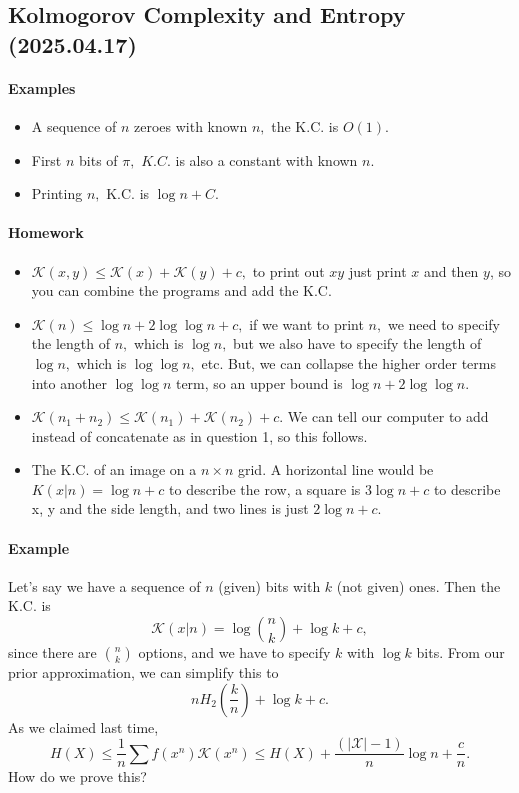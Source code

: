\documentclass[12pt]{article}
\theoremstyle{remark}
\begin{document}
\subsection{Kolmogorov Complexity and Entropy (2025.04.17)}
\paragraph{Examples}
\begin{itemize}
    \item A sequence of $n$ zeroes with known $n,$ the K.C. is $O(1).$
    \item First $n$ bits of $\pi,$ $K.C.$ is also a constant with known $n$.
    \item Printing $n,$ K.C. is $\log n +C.$
\end{itemize}

\paragraph{Homework}
\begin{itemize}
    \item $\mathcal{K}(x,y)\le \mathcal{K}(x)+\mathcal{K}(y)+c,$ to print out $xy$ just print $x$ and then $y$, so you can combine the programs and add the K.C.
    \item $\mathcal{K}(n)\le\log n+2\log\log n+c,$ if we want to print $n,$ we need to specify the length of $n,$ which is $\log n,$ but we also have to specify the length of $\log n,$ which is $\log\log n,$ etc. But, we can collapse the higher order terms into another $\log\log n$ term, so an upper bound is $\log n + 2\log\log n.$
    \item $\mathcal{K}(n_1+n_2)\le \mathcal{K}(n_1)+\mathcal{K}(n_2)+c.$ We can tell our computer to add instead of concatenate as in question 1, so this follows.
    \item The K.C. of an image on a $n\times n$ grid. A horizontal line would be $K(x|n) = \log n+c$ to describe the row, a square is $3 \log n+c$ to describe x, y and the side length, and two lines is just $2\log n+c$.
\end{itemize}

\paragraph{Example}
Let's say we have a sequence of $n$ (given) bits with $k$ (not given) ones. Then the K.C. is
\[\mathcal{K}(x|n)=\log\binom{n}{k}+\log k+c,\] since there are $\binom{n}{k}$ options, and we have to specify $k$ with $\log k$ bits. From our prior approximation, we can simplify this to
\[nH_2\left(\frac{k}{n}\right)+\log k+ c.\]
As we claimed last time,
\[H(X)\le\frac{1}{n}\sum f(x^n)\mathcal{K}(x^n)\le H(X)+\frac{(|\mathcal{X}|-1)}{n}\log n+\frac{c}{n}.\]
How do we prove this? 
\end{document}
